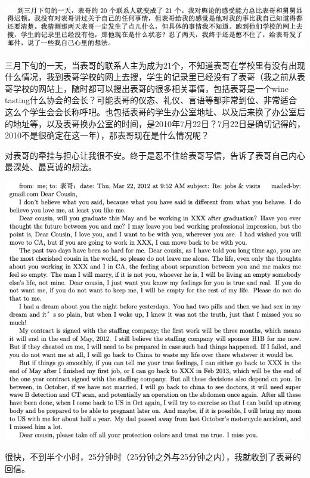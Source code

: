 \documentclass[9pt, b5paper]{article}
\begin{document}
\begin{center}
\includegraphics[width=.9\linewidth]{./pic/p1p115-1.png}
\end{center}

三月下旬的一天，当表哥的联系人主为成为21个，不知道表哥在学校里有没有出现什么情况，我到表哥学校的网上去搜，学生的记录里已经没有了表哥（我之前从表哥学校的网站上，随时都可以搜出表哥的很多相关事情，包括表哥是一个wine tasting什么协会的会长？可能表哥的仪态、礼仪、言语等都非常到位、非常适合这么个学生会会长称呼吧。也包括表哥的学生办公室地址、以及后来换了办公室后的地址等，以及表哥换办公室的时间，是2010年7月22日？7月22日是确切记得的，2010不是很确定在这一年），那表哥现在是什么情况呢？

对表哥的牵挂与担心让我很不安。终于是忍不住给表哥写信，告诉了表哥自己内心最深处、最真诚的想法。 

\begin{center}
\includegraphics[width=.9\linewidth]{./pic/p1p116.png}
\end{center}

很快，不到半个小时，25分钟时（25分钟之外与25分钟之内），我就收到了表哥的回信。
\end{document}
